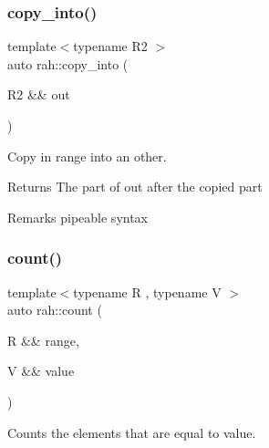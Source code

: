 \subsubsection{\texorpdfstring{copy\_into()}{copy\_into()}}
{\footnotesize\ttfamily template$<$typename R2 $>$ \\
auto rah\+::copy\+\_\+into (\begin{DoxyParamCaption}\item[{R2 \&\&}]{out }\end{DoxyParamCaption})}



Copy in range into an other. 

\begin{DoxyReturn}{Returns}
The part of out after the copied part 
\end{DoxyReturn}
\begin{DoxyRemark}{Remarks}
pipeable syntax
\end{DoxyRemark}

\begin{DoxyCodeInclude}{0}
\end{DoxyCodeInclude}
\mbox{\label{namespacerah_aa528865cc4a45d4eb276329554f16b4b}} 
\subsubsection{\texorpdfstring{count()}{count()}\hspace{0.1cm}{\footnotesize\ttfamily [1/2]}}
{\footnotesize\ttfamily template$<$typename R , typename V $>$ \\
auto rah\+::count (\begin{DoxyParamCaption}\item[{R \&\&}]{range,  }\item[{V \&\&}]{value }\end{DoxyParamCaption})}



Counts the elements that are equal to value. 


